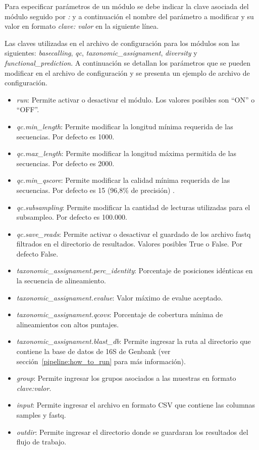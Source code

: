 Para especificar parámetros de un módulo se debe indicar la clave asociada del módulo seguido por \textit{:} y a continuación el nombre del parámetro a modificar y su valor en formato \textit{clave: valor} en la siguiente línea.

Las claves utilizadas en el archivo de configuración para los módulos son las siguientes: \textit{basecalling}, \textit{qc}, \textit{taxonomic\_assignament}, \textit{diversity} y \textit{functional\_prediction}.
A continuación se detallan los parámetros que se pueden modificar en el archivo de configuración y se presenta un ejemplo de archivo de configuración.%

\begin{itemize}
    \item \textit{run}: Permite activar o desactivar el módulo. Los valores posibles son ``ON'' o ``OFF''. 
    \item \textit{qc.min\_length}: Permite modificar la longitud mínima requerida de las secuencias. Por defecto es 1000.
    \item \textit{qc.max\_length}: Permite modificar la longitud máxima permitida de las secuencias. Por defecto es 2000.
    \item \textit{qc.min\_qscore}: Permite modificar la calidad mínima requerida de las secuencias. Por defecto es 15 (96,8\% de precisión) .
    \item \textit{qc.subsampling}: Permite modificar la cantidad de lecturas utilizadas para el subsampleo. Por defecto es 100.000.
    \item \textit{qc.save\_reads}: Permite activar o desactivar el guardado de los archivo fastq filtrados en el directorio de resultados. Valores posibles True o False. Por defecto False. 
    \item \textit{taxonomic\_assignament.perc\_identity}: Porcentaje de posiciones idénticas en la secuencia de alineamiento.
    \item \textit{taxonomic\_assignament.evalue}: Valor máximo de evalue aceptado.
    \item \textit{taxonomic\_assignament.qcovs}: Porcentaje de cobertura mínima de alineamientos con altos puntajes.
    \item \textit{taxonomic\_assignament.blast\_db}: Permite ingresar la ruta al directorio que contiene la base de datos de 16S de Genbank (ver sección~\ref{pipeline:how_to_run} para más información).
    \item \textit{group}: Permite ingresar los grupos asociados a las muestras en formato \textit{clave:valor}.
    \item \textit{input}: Permite ingresar el archivo en formato CSV que contiene las columnas samples y fastq.
    \item \textit{outdir}: Permite ingresar el directorio donde se guardaran los resultados del flujo de trabajo.
\end{itemize}

